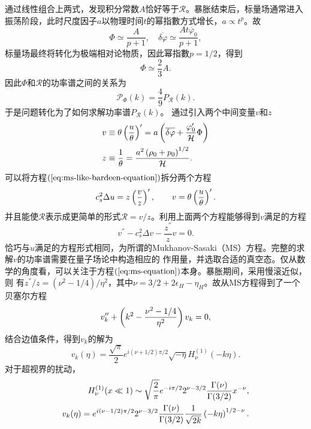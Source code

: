 通过线性组合上两式，发现积分常数$A$恰好等于$\mathcal{R}$。暴胀结束后，标量场通常进入
振荡阶段，此时尺度因子$a$以物理时间$t$的幂指數方式增长，$a\propto
t^{p}$。故
\begin{equation}
  \Phi \simeq \frac{A}{p+1},\quad 
  \overline{\delta\varphi}\simeq \frac{At\dot{\varphi_0}}{p+1},
\end{equation}
标量场最终将转化为极端相对论物质，因此幂指數$p=1 /2$，得到
\begin{equation}
  \Phi \simeq \frac{2}{3}A. 
\end{equation}
因此$\Phi$和$\mathcal{R}$的功率谱之间的关系为
\begin{equation}
  \mathcal{P}_{\Phi}(k) = \frac{4}{9}P_{\mathcal{R}}(k). 
\end{equation}
于是问题转化为了如何求解功率谱$P_{\mathcal{R}}(k)$。
通过引入两个中间变量$v$和$z$
\begin{align}
  v&\equiv\theta\left(\frac{u}{\theta}\right)^{\prime} 
  =a\left(\overline{\delta\varphi} +
  \frac{\varphi^\prime_0}{\mathcal{H}}\Phi\right) \\
  z&\equiv \frac{1}{\theta} = \frac{a^2\left(\rho_0+p_0\right)^{1
  /2}}{\mathcal{H}}.
\end{align}
可以将方程$(\ref{eq:ms-like-bardeen-equation})$拆分两个方程
\begin{equation}
  c_{s}^2\Delta u=z\left(\frac{v}{z}\right)^{\prime},\qquad
  v=\theta\left(\frac{u}{\theta}\right)^{\prime}.
\end{equation}
并且能使$\mathcal{R}$表示成更简单的形式$\mathcal{R}=v
/z$。利用上面两个方程能够得到$v$满足的方程
\begin{equation}
  \label{eq:ms-equation}
  v^{\dprime}- c_s^2\Delta v - \frac{z^{\dprime}}{z}v = 0.
\end{equation}
恰巧与$u$满足的方程形式相同，为所谓的Mukhanov-Sasaki（MS）方程。完整的求解$v$的功率谱需要在量子场论中构造相应的
作用量，并选取合适的真空态。仅从数学的角度看，可以关注于方程$(\ref{eq:ms-equation})$本身。暴胀期间，采用慢滚近似，则
有$z^{\dprime} /z = (\nu^2-1 /4) /\eta^2$，其中$\nu=3
/2+2\epsilon_H-\eta_H$。故从MS方程得到了一个贝塞尔方程
\begin{equation}
  v^{\prime\prime}_k +\left(k^2-\frac{\nu^2-1 /4}{\eta^2}\right)v_{k} =0, 
\end{equation}
结合边值条件，得到$v_{k}$的解为
\begin{equation}
  v_{k}(\eta) = \frac{\sqrt{\pi}}{2}e^{i(\nu+1 /2)\pi
  /2}\sqrt{-\eta}H^{(1)}_{\nu}(-k\eta).
\end{equation}
对于超视界的扰动，
\begin{align}
  H^{(1)}_{\nu}(x\ll 1) \sim \sqrt{\frac{2}{\pi}}e^{-i\pi /2}2^{\nu-3 /2}
  \frac{\Gamma(\nu)}{\Gamma(3 /2)}x^{-\nu}, \\
  v_{k}(\eta)=e^{i(\nu-1 /2)\pi /2}2^{\nu-3 /2}
  \frac{\Gamma(\nu)}{\Gamma(3 /2)} \frac{1}{\sqrt{2k}}\left(-k\eta\right)^{1
  /2-\nu}.
\end{align}

